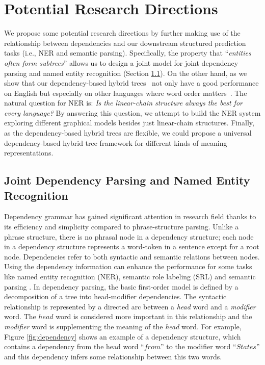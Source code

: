 \chapter{Potential Research Directions} %

\label{Chapter7}


We propose some potential research directions by further making use of the relationship between dependencies and our downstream structured prediction tasks (i.e., NER and semantic parsing). 
Specifically, the property that ``\textit{entities often form subtrees}'' allows us to design a joint model for joint dependency parsing and named entity recognition (Section \ref{sec:jointdepner}).
On the other hand, as we show that our dependency-based hybrid trees~\cite{jie2018dependency} not only have a good performance on English but especially on other languages where word order matters~\cite{ahmad2019difficulties}. 
The natural question for NER is: \textit{Is the linear-chain structure always the best for every language?}  
By answering this question, we attempt to build the NER system exploring different graphical models besides just linear-chain structures. 
Finally, as the dependency-based hybrid trees are flexible, we could propose a universal dependency-based hybrid tree framework for different kinds of meaning representations.



\section{Joint Dependency Parsing and Named Entity Recognition}
\label{sec:jointdepner}

Dependency grammar has gained significant attention in research field thanks to its efficiency and simplicity compared to phrase-structure parsing. 
Unlike a phrase structure, there is no phrasal node in a dependency structure; each node in a dependency structure represents a word-token in a sentence except for a root node. 
Dependencies refer to both syntactic and semantic relations between nodes. Using the dependency information can enhance the performance for some tasks like named entity recognition (NER), semantic role labeling (SRL) and semantic parsing \cite{kazama2008inducing,ling2012fine,johansson2008dependency,hacioglu2004semantic,poon2009unsupervised}.  
In dependency parsing, the basic first-order model \cite{eisner1996three} is defined by a decomposition of a tree into head-modifier dependencies. 
The syntactic relationship is represented by a directed arc between a \textit{head} word and a \textit{modifier} word. The $head$ word is considered more important in this relationship and the \textit{modifier} word is supplementing the meaning of the \textit{head} word. For example, Figure \ref{fig:dependency} shows an example of a dependency structure, which contains a dependency from the head word ``$from$'' to the modifier word ``$States$'' and this dependency infers some relationship between this two words.


